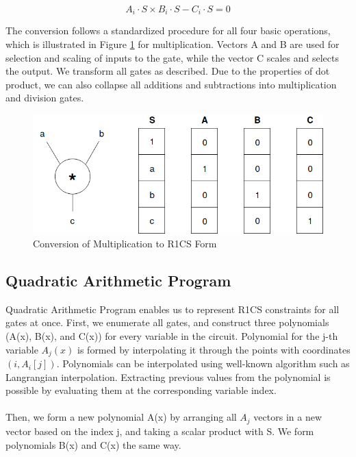 $$ A_i \cdot S \times B_i \cdot S - C_i \cdot S = 0 $$

\noindent The conversion follows a standardized procedure for all four basic operations, which is illustrated in Figure \ref{fig:r1csmul} for multiplication. Vectors A and B are used for selection and scaling of inputs to the gate, while the vector C scales and selects the output. We transform all gates as described. Due to the properties of dot product, we can also collapse all additions and subtractions into multiplication and division gates.

\begin{figure}[h]
    \includegraphics[width=\linewidth]{Figures/R1CS.png}
    \caption{Conversion of Multiplication to R1CS Form}
    \label{fig:r1csmul}
\end{figure}

\subsection{Quadratic Arithmetic Program}
Quadratic Arithmetic Program enables us to represent R1CS constraints for all gates at once. First, we enumerate all gates, and construct three polynomials (A(x), B(x), and C(x)) for every variable in the circuit. Polynomial for the j-th variable $A_j(x)$ is formed by interpolating it through the points with coordinates $(i, A_i[j])$. 
Polynomials can be interpolated using well-known algorithm such as Langrangian interpolation. Extracting previous values from the polynomial is possible by evaluating them at the corresponding variable index.\\
\\
Then, we form a new polynomial A(x) by arranging all $A_j$ vectors in a new vector based on the index j, and taking a scalar product with S. We form polynomials B(x) and C(x) the same way.

